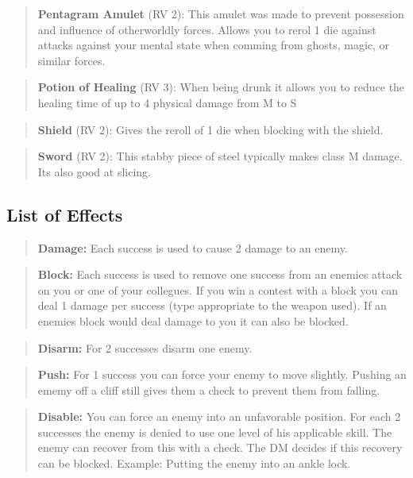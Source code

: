 \documentclass[11pt]{article}
\begin{document}
{\begin{multicols}{2}[]
\begin{quote}
\textbf{Pentagram Amulet} (RV 2): This amulet was made to prevent possession and influence of otherworldly forces. Allows you to rerol 1 die against attacks against your mental state when comming from ghosts, magic, or similar forces.
\end{quote}

\begin{quote}
\textbf{Potion of Healing} (RV 3): When being drunk it allows you to reduce the healing time of up to 4 physical damage from M to S
\end{quote}

\begin{quote}
\textbf{Shield} (RV 2): Gives the reroll of 1 die when blocking with the shield.
\end{quote}

\begin{quote}
\textbf{Sword} (RV 2): This stabby piece of steel typically makes class M damage. Its also good at slicing.
\end{quote}

\subsection{List of Effects}
\label{sec:org2d39862}
\begin{quote}
\textbf{Damage:} Each success is used to cause 2 damage to an enemy.
\end{quote}

\begin{quote}
\textbf{Block:} Each success is used to remove one success from an enemies attack on you or one of your collegues. If you win a contest with a block you can deal 1 damage per success (type appropriate to the weapon used). If an enemies block would deal damage to you it can also be blocked.
\end{quote}

\begin{quote}
\textbf{Disarm:} For 2 successes disarm one enemy.
\end{quote}

\begin{quote}
\textbf{Push:} For 1 success you can force your enemy to move slightly. Pushing an ememy off a cliff still gives them a check to prevent them from falling.
\end{quote}

\begin{quote}
\textbf{Disable:} You can force an enemy into an unfavorable position. For each 2 successes the enemy is denied to use one level of his applicable skill. The enemy can recover from this with a check. The DM decides if this recovery can be blocked. Example: Putting the enemy into an ankle lock.
\end{quote}


\end{multicols}}
\end{document}
